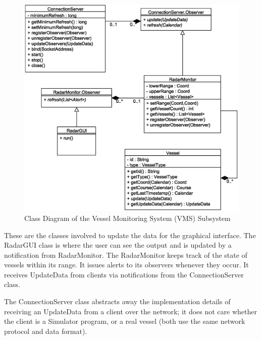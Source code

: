 \documentclass{article}
\begin{document}
\break
\begin{figure}[!htb]	
\caption{Class Diagram of the Vessel Monitoring System (VMS) Subsystem}
\centering
\includegraphics[scale=0.7]{diagrams/vms-class-diagram.eps}
\end{figure}
These are the classes involved to update the data for the graphical interface. The RadarGUI class is where the user can see the output and is updated by a notification from RadarMonitor.
The RadarMonitor keeps track of the state of vessels within its range. It issues alerts to its observers whenever they occur. It receives UpdateData from clients via notifications from the ConnectionServer class.

The ConnectionServer class abstracts away the implementation details of receiving an UpdateData from a client over the network; it does not care whether the client is a Simulator program, or a real vessel (both use the same network protocol and data format).
\end{document}
